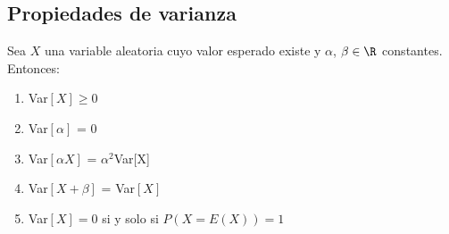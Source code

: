 \subsection{Propiedades de varianza}
\begin{Teo}
    Sea $X$ una variable aleatoria cuyo valor esperado existe y 
    $\alpha$, $\beta \in \R$ constantes. Entonces:

    \begin{enumerate}
        \item Var$[X] \geq 0$ 
        \item Var$[\alpha]$ = 0
        \item Var$[\alpha X]$ = $\alpha^2$Var[X]
        \item Var$[X + \beta]$ = Var$[X]$
        \item Var$[X] = 0$ si y solo si $P(X=E(X))=1$ 
    \end{enumerate}
\end{Teo}
